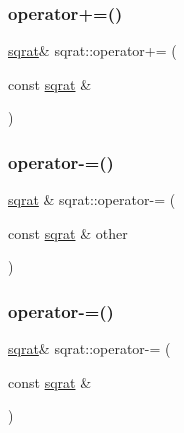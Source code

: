\mbox{\label{classsqrat_ada81ae4a5701bba66394cf1a69786e70}} 
\subsubsection{\texorpdfstring{operator+=()}{operator+=()}\hspace{0.1cm}{\footnotesize\ttfamily [2/2]}}
{\footnotesize\ttfamily \mbox{\hyperlink{classsqrat}{sqrat}}\& sqrat\+::operator+= (\begin{DoxyParamCaption}\item[{const \mbox{\hyperlink{classsqrat}{sqrat}} \&}]{ }\end{DoxyParamCaption})}

\mbox{\label{classsqrat_a1febaf3ebc9433b43d17f14e74f2057f}} 
\subsubsection{\texorpdfstring{operator-\/=()}{operator-=()}\hspace{0.1cm}{\footnotesize\ttfamily [1/2]}}
{\footnotesize\ttfamily \mbox{\hyperlink{classsqrat}{sqrat}} \& sqrat\+::operator-\/= (\begin{DoxyParamCaption}\item[{const \mbox{\hyperlink{classsqrat}{sqrat}} \&}]{other }\end{DoxyParamCaption})}

\mbox{\label{classsqrat_a774a997c67358fea54d41cd8f29bdd3a}} 
\subsubsection{\texorpdfstring{operator-\/=()}{operator-=()}\hspace{0.1cm}{\footnotesize\ttfamily [2/2]}}
{\footnotesize\ttfamily \mbox{\hyperlink{classsqrat}{sqrat}}\& sqrat\+::operator-\/= (\begin{DoxyParamCaption}\item[{const \mbox{\hyperlink{classsqrat}{sqrat}} \&}]{ }\end{DoxyParamCaption})}

